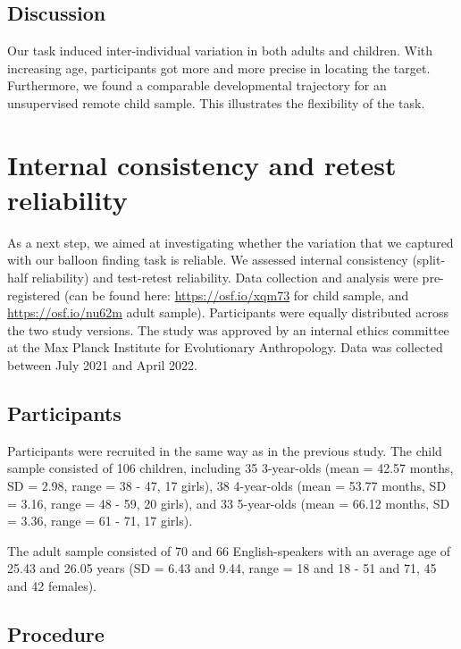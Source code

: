 \documentclass[
  man,floatsintext]{apa6}
\begin{document}
\hypertarget{discussion}{%
\subsection{Discussion}\label{discussion}}

Our task induced inter-individual variation in both adults and children. With increasing age, participants got more and more precise in locating the target. Furthermore, we found a comparable developmental trajectory for an unsupervised remote child sample. This illustrates the flexibility of the task.

\hypertarget{internal-consistency-and-retest-reliability}{%
\section{Internal consistency and retest reliability}\label{internal-consistency-and-retest-reliability}}

As a next step, we aimed at investigating whether the variation that we captured with our balloon finding task is reliable. We assessed internal consistency (split-half reliability) and test-retest reliability. Data collection and analysis were pre-registered (can be found here: \url{https://osf.io/xqm73} for child sample, and \url{https://osf.io/nu62m} adult sample). Participants were equally distributed across the two study versions. The study was approved by an internal ethics committee at the Max Planck Institute for Evolutionary Anthropology. Data was collected between July 2021 and April 2022.

\hypertarget{participants-1}{%
\subsection{Participants}\label{participants-1}}

Participants were recruited in the same way as in the previous study. The child sample consisted of
106 children, including
35 3-year-olds
(mean = 42.57 months,
SD = 2.98,
range = 38
- 47,
17 girls),
38 4-year-olds
(mean = 53.77 months,
SD = 3.16,
range = 48
- 59,
20 girls),
and 33 5-year-olds
(mean = 66.12 months,
SD = 3.36,
range = 61
- 71,
17 girls).

The adult sample consisted of 70 and 66 English-speakers with an average age of 25.43 and 26.05 years (SD = 6.43 and 9.44, range = 18 and 18 - 51 and 71, 45 and 42 females).

\hypertarget{procedure-1}{%
\subsection{Procedure}\label{procedure-1}}
\end{document}
